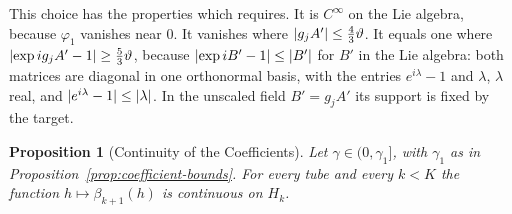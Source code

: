 \documentclass[11pt]{preprint}
\DeclarePairedDelimiter{\abs}{\lvert}{\rvert}
\numberwithin{equation}{section}
\newtheorem{proposition}{Proposition}
\theoremstyle{definition}
\theoremstyle{remark}
\theoremstyle{plain}
\begin{document}
This choice has the properties which \cite[p.~252]{BalabanCRE} requires. It is $C^\infty$ on the Lie algebra, because $\varphi_1$ vanishes near $0$. It vanishes where $\abs{g_jA'} \leq \frac43\vartheta$. It equals one where $\abs{\exp ig_jA' - 1} \geq \frac53\vartheta$, because $\abs{\exp iB' - 1} \leq \abs{B'}$ for $B'$ in the Lie algebra: both matrices are diagonal in one orthonormal basis, with the entries $e^{i\lambda} - 1$ and $\lambda$, $\lambda$ real, and $\abs{e^{i\lambda} - 1} \leq \abs{\lambda}$. In the unscaled field $B' = g_jA'$ its support is fixed by the target.

\begin{proposition}[Continuity of the Coefficients]\label{prop:coefficient-continuity}
Let $\gamma \in (0, \gamma_1]$, with $\gamma_1$ as in Proposition~\ref{prop:coefficient-bounds}. For every tube and every $k < K$ the function $h \mapsto \beta_{k+1}(h)$ is continuous on $H_k$.
\end{proposition}
\end{document}
